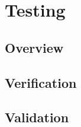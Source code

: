 \section{Testing}																	
\label{sec:Testing}

\subsection{Overview} 

\subsection{Verification}

\subsection{Validation}
